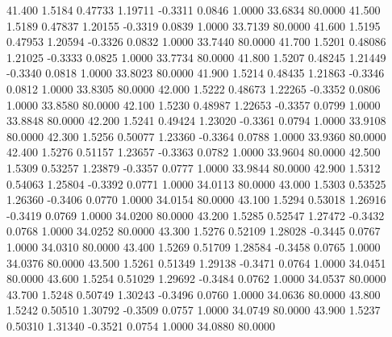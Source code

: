   41.400   1.5184   0.47733   1.19711  -0.3311   0.0846   1.0000  33.6834  80.0000
  41.500   1.5189   0.47837   1.20155  -0.3319   0.0839   1.0000  33.7139  80.0000
  41.600   1.5195   0.47953   1.20594  -0.3326   0.0832   1.0000  33.7440  80.0000
  41.700   1.5201   0.48086   1.21025  -0.3333   0.0825   1.0000  33.7734  80.0000
  41.800   1.5207   0.48245   1.21449  -0.3340   0.0818   1.0000  33.8023  80.0000
  41.900   1.5214   0.48435   1.21863  -0.3346   0.0812   1.0000  33.8305  80.0000
  42.000   1.5222   0.48673   1.22265  -0.3352   0.0806   1.0000  33.8580  80.0000
  42.100   1.5230   0.48987   1.22653  -0.3357   0.0799   1.0000  33.8848  80.0000
  42.200   1.5241   0.49424   1.23020  -0.3361   0.0794   1.0000  33.9108  80.0000
  42.300   1.5256   0.50077   1.23360  -0.3364   0.0788   1.0000  33.9360  80.0000
  42.400   1.5276   0.51157   1.23657  -0.3363   0.0782   1.0000  33.9604  80.0000
  42.500   1.5309   0.53257   1.23879  -0.3357   0.0777   1.0000  33.9844  80.0000
  42.900   1.5312   0.54063   1.25804  -0.3392   0.0771   1.0000  34.0113  80.0000
  43.000   1.5303   0.53525   1.26360  -0.3406   0.0770   1.0000  34.0154  80.0000
  43.100   1.5294   0.53018   1.26916  -0.3419   0.0769   1.0000  34.0200  80.0000
  43.200   1.5285   0.52547   1.27472  -0.3432   0.0768   1.0000  34.0252  80.0000
  43.300   1.5276   0.52109   1.28028  -0.3445   0.0767   1.0000  34.0310  80.0000
  43.400   1.5269   0.51709   1.28584  -0.3458   0.0765   1.0000  34.0376  80.0000
  43.500   1.5261   0.51349   1.29138  -0.3471   0.0764   1.0000  34.0451  80.0000
  43.600   1.5254   0.51029   1.29692  -0.3484   0.0762   1.0000  34.0537  80.0000
  43.700   1.5248   0.50749   1.30243  -0.3496   0.0760   1.0000  34.0636  80.0000
  43.800   1.5242   0.50510   1.30792  -0.3509   0.0757   1.0000  34.0749  80.0000
  43.900   1.5237   0.50310   1.31340  -0.3521   0.0754   1.0000  34.0880  80.0000
